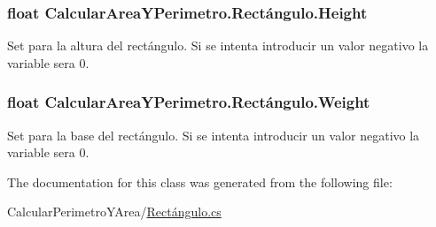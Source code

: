 \subsubsection[{Height}]{\setlength{\rightskip}{0pt plus 5cm}float Calcular\+Area\+Y\+Perimetro.\+Rectángulo.\+Height\hspace{0.3cm}{\ttfamily [set]}}\label{class_calcular_area_y_perimetro_1_1_rect_xC3_xA1ngulo_a5b2b03b9dc4ffe23a68e697ecc8fbc91}


Set para la altura del rectángulo. Si se intenta introducir un valor negativo la variable sera 0. 

\hypertarget{class_calcular_area_y_perimetro_1_1_rect_xC3_xA1ngulo_a19af4a57456caf9042cca100d3a9bc52}{}
\subsubsection[{Weight}]{\setlength{\rightskip}{0pt plus 5cm}float Calcular\+Area\+Y\+Perimetro.\+Rectángulo.\+Weight\hspace{0.3cm}{\ttfamily [set]}}\label{class_calcular_area_y_perimetro_1_1_rect_xC3_xA1ngulo_a19af4a57456caf9042cca100d3a9bc52}


Set para la base del rectángulo. Si se intenta introducir un valor negativo la variable sera 0. 



The documentation for this class was generated from the following file\+:\begin{DoxyCompactItemize}
\item 
Calcular\+Perimetro\+Y\+Area/\hyperlink{_rect_xC3_xA1ngulo_8cs}{Rectángulo.\+cs}\end{DoxyCompactItemize}
